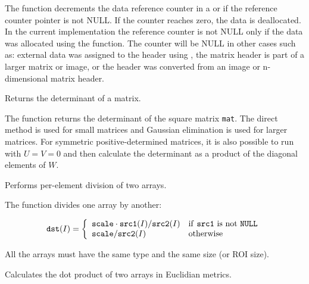 The function decrements the data reference counter in a  or
 if the reference counter pointer
is not NULL. If the counter reaches zero, the data is deallocated. In the
current implementation the reference counter is not NULL only if the data
was allocated using the  function. The counter will be NULL in other cases such as:
external data was assigned to the header using , the matrix
header is part of a larger matrix or image, or the header was converted from an image or n-dimensional matrix header. 

\fi


Returns the determinant of a matrix.


\begin{description}
\end{description}

The function returns the determinant of the square matrix \texttt{mat}. The direct method is used for small matrices and Gaussian elimination is used for larger matrices. For symmetric positive-determined matrices, it is also possible to run
with $U = V = 0$ and then calculate the determinant as a product of the diagonal elements of $W$.

Performs per-element division of two arrays.


\begin{description}
\end{description}

The function divides one array by another:

\[
\texttt{dst}(I)=\left\{ \begin{array}{l l} \texttt{scale} \cdot \texttt{src1}(I)/\texttt{src2}(I) & \mbox{if \texttt{src1} is not \texttt{NULL}}\\ \texttt{scale}/\texttt{src2}(I) & \mbox{otherwise}\\ \end{array} \right.
\]

All the arrays must have the same type and the same size (or ROI size).


Calculates the dot product of two arrays in Euclidian metrics.

